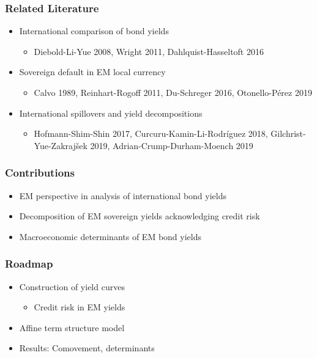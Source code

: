 \documentclass[12pt, aspectratio=169, xcolor=dvipsnames]{beamer} 			         %
\begin{document}
\begin{frame}
	\frametitle{Related Literature}
	\begin{itemize}
		\item International comparison of bond yields
		\begin{itemize}
			\item \footnotesize Diebold-Li-Yue 2008, Wright 2011, Dahlquist-Hasseltoft 2016
		\end{itemize}
		\item Sovereign default in EM local currency
		\begin{itemize}
			\item \footnotesize Calvo 1989, Reinhart-Rogoff 2011, Du-Schreger 2016, Otonello-Pérez 2019
		\end{itemize}
		\item International spillovers and yield decompositions
		\begin{itemize}
			\item \footnotesize Hofmann-Shim-Shin 2017, Curcuru-Kamin-Li-Rodríguez 2018, Gilchrist-Yue-Zakrajšek 2019, Adrian-Crump-Durham-Moench 2019
		\end{itemize}
	\end{itemize}
\end{frame}

\begin{frame}
	\frametitle{Contributions}
	\begin{itemize}
		\item \alert{EM perspective} in analysis of international bond yields
		\item Decomposition of EM sovereign yields acknowledging \alert{credit risk}
		\item Macroeconomic \alert{determinants} of EM bond yields
	\end{itemize}
\end{frame}

\begin{frame}
	\frametitle{Roadmap}
	\begin{itemize}
		\item Construction of yield curves
		\begin{itemize}
			\item Credit risk in EM yields
		\end{itemize}
		\item Affine term structure model
		\item Results: Comovement, determinants %
	\end{itemize}
\end{frame}
\end{document}
